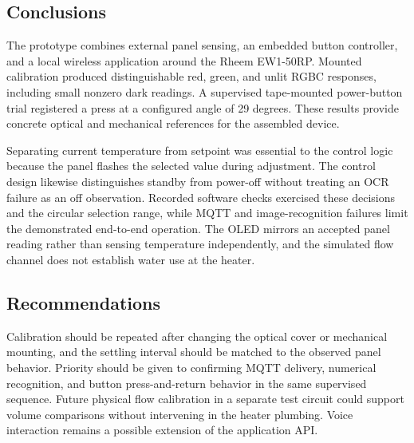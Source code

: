\subsection{Conclusions}
The prototype combines external panel sensing, an embedded button controller, and a local wireless application around the Rheem EW1-50RP. Mounted calibration produced distinguishable red, green, and unlit RGBC responses, including small nonzero dark readings. A supervised tape-mounted power-button trial registered a press at a configured angle of 29 degrees. These results provide concrete optical and mechanical references for the assembled device.

Separating current temperature from setpoint was essential to the control logic because the panel flashes the selected value during adjustment. The control design likewise distinguishes standby from power-off without treating an OCR failure as an off observation. Recorded software checks exercised these decisions and the circular selection range, while MQTT and image-recognition failures limit the demonstrated end-to-end operation. The OLED mirrors an accepted panel reading rather than sensing temperature independently, and the simulated flow channel does not establish water use at the heater.

\subsection{Recommendations}
Calibration should be repeated after changing the optical cover or mechanical mounting, and the settling interval should be matched to the observed panel behavior. Priority should be given to confirming MQTT delivery, numerical recognition, and button press-and-return behavior in the same supervised sequence. Future physical flow calibration in a separate test circuit could support volume comparisons without intervening in the heater plumbing. Voice interaction remains a possible extension of the application API.
